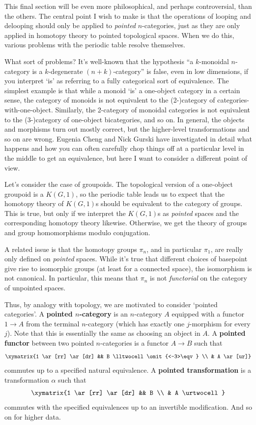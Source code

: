 \documentclass{amsart}
\begin{document}
This final section will be even more philosophical, and perhaps
controversial, than the others.  The central point I wish to make is
that the operations of looping and delooping should only be
applied to \emph{pointed} $n$-categories, just as they are only
applied in homotopy theory to pointed topological spaces.  When we do
this, various problems with the periodic table resolve themselves.

What sort of problems?  It's well-known that the hypothesis ``a
$k$-monoidal $n$-category is a $k$-degenerate $(n+k)$-category'' is
false, even in low dimensions, if you interpret `is' as referring to a
fully categorical sort of equivalence.  The simplest example is that
while a monoid `is' a one-object category in a certain sense, the
category of monoids is not equivalent to the (2-)category of
categories-with-one-object.  Similarly, the 2-category of monoidal
categories is not equivalent to the (3-)category of one-object
bicategories, and so on.  In general, the objects and morphisms turn
out mostly correct, but the higher-level transformations and so on are
wrong.  Eugenia Cheng and Nick Gurski have investigated in detail what
happens and how you can often carefully chop things off at a
particular level in the middle to get an equivalence, but here I want
to consider a different point of view.

Let's consider the case of groupoids.  The topological version of a
one-object groupoid is a $K(G,1)$, so the periodic table leads us to
expect that the homotopy theory of $K(G,1)$s should be equivalent to
the category of groups.  This is true, but only if we interpret the
$K(G,1)$s as \emph{pointed} spaces and the corresponding homotopy
theory likewise.  Otherwise, we get the theory of groups and group
homomorphisms modulo conjugation.

A related issue is that the homotopy groups $\pi_n$, and in particular
$\pi_1$, are really only defined on \emph{pointed} spaces.  While it's
true that different choices of basepoint give rise to isomorphic
groups (at least for a connected space), the isomorphism is not
canonical.  In particular, this means that $\pi_n$ is not
\emph{functorial} on the category of unpointed spaces.

Thus, by analogy with topology, we are motivated to consider `pointed
categories'.  A \textbf{pointed $n$-category} is an $n$-category $A$
equipped with a functor $1\to A$ from the terminal $n$-category (which
has exactly one $j$-morphism for every $j$).  Note that this is
essentially the same as choosing an object in $A$.  A \textbf{pointed
  functor} between two pointed $n$-categories is a functor $A\to B$
such that
\[\xymatrix{1 \ar[rr] \ar[dr] && B \lltwocell\omit{<-3>\eqv} \\ & A \ar[ur]}\]
commutes up to a specified natural equivalence.  A \textbf{pointed
  transformation} is a transformation $\alpha$ such that
\[\xymatrix{1 \ar[rr] \ar[dr] && B \\ & A \urtwocell}\]
commutes with the specified equivalences up to an invertible
modification.  And so on for higher data.
\end{document}
